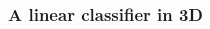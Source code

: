 \documentclass[compress]{beamer}
\newcommand{\1}{\mathbf{1}}
\begin{document}
\begin{frame}
\frametitle{A linear classifier in 3D}

\begin{columns}[t]
\begin{column}[T]{6cm}


\end{column}
\end{columns}
\end{frame}
\end{document}
